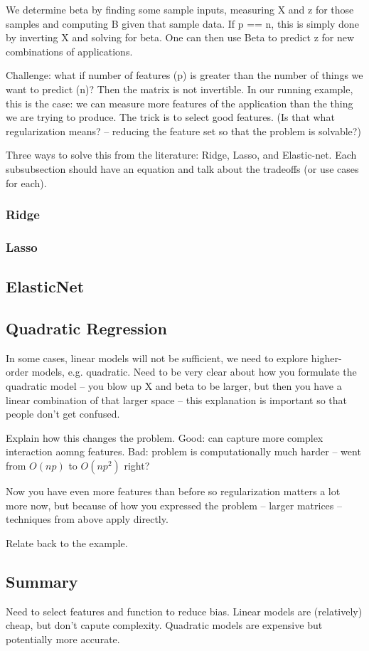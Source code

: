 We determine beta by finding some sample inputs, measuring X and z for
those samples and computing B given that sample data.  If p == n, this
is simply done by inverting X and solving for beta.  One can then use
Beta to predict z for new combinations of applications.

Challenge: what if number of features (p) is greater than the number
of things we want to predict (n)?  Then the matrix is not invertible.
In our running example, this is the case: we can measure more features
of the application than the thing we are trying to produce.  The trick
is to select good features.  (Is that what regularization means? --
reducing the feature set so that the problem is solvable?)

Three ways to solve this from the literature: Ridge, Lasso, and
Elastic-net.  Each subsubsection should have an equation and talk
about the tradeoffs (or use cases for each).

\subsubsection{Ridge}

\subsubsection{Lasso}

\subsection{ElasticNet}


\subsection{Quadratic Regression}
In some cases, linear models will not be sufficient, we need to
explore higher-order models, e.g. quadratic.  Need to be very clear
about how you formulate the quadratic model -- you blow up X and beta
to be larger, but then you have a linear combination of that larger
space -- this explanation is important so that people don't get
confused.

Explain how this changes the problem.  Good: can capture more complex
interaction aomng features.  Bad: problem is computationally much
harder -- went from $O(np)$ to $O(np^2)$ right?

Now you have even more features than before so regularization matters
a lot more now, but because of how you expressed the problem -- larger
matrices -- techniques from above apply directly.

Relate back to the example.

\subsection{Summary}

Need to select features and function to reduce bias.  Linear models
are (relatively) cheap, but don't capute complexity.  Quadratic models
are expensive but potentially more accurate.




